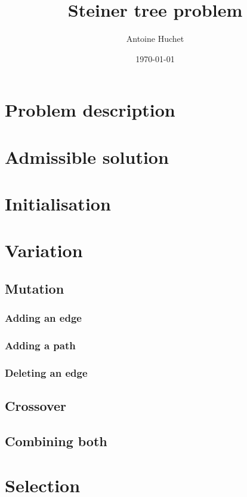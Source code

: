 \documentclass{article}
\title{Steiner tree problem}
\date{\today}
\author{Antoine Huchet}
\theoremstyle{plain} %
\theoremstyle{definition} %
\begin{document}
 \maketitle

\section{Problem description}

\section{Admissible solution}

\section{Initialisation}

\section{Variation}

\subsection{Mutation}

\subsubsection{Adding an edge}

\subsubsection{Adding a path}

\subsubsection{Deleting an edge}

\subsection{Crossover}

\subsection{Combining both}

\section{Selection}
\end{document}
